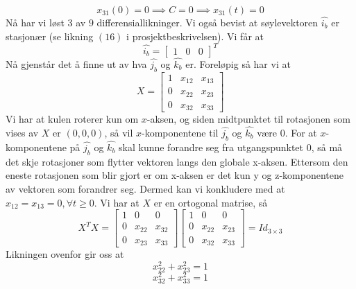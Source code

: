 \begin{equation}
    x_{31}(0)=0\implies C=0\implies x_{31}(t)=0
\end{equation}
Nå har vi løst $3$ av $9$ differensiallikninger. Vi også bevist at søylevektoren $\hat{i_b}$ er stasjonær (se likning $(16)$ i prosjektbeskrivelsen). Vi får at
\begin{equation}
\label{eqn:rolig}
\hat{i_b}=\begin{bmatrix}1&0&0\end{bmatrix}^T
\end{equation}
Nå gjenstår det å finne ut av hva $\hat{j_b}$ og $\hat{k_b}$ er. Foreløpig så har vi at
\begin{equation}
    X=\begin{bmatrix}1&x_{12}&x_{13}\\0&x_{22}&x_{23}\\0&x_{32}&x_{33}\end{bmatrix}
\end{equation}
Vi har at kulen roterer kun om $x$-aksen, og siden midtpunktet til rotasjonen som vises av $X$ er $(0,0,0)$, så vil $x$-komponentene til $\hat{j_b}$ og $\hat{k_b}$ være 0. For at $x$-komponentene på $\hat{j_b}$ og $\hat{k_b}$ skal kunne forandre seg fra utgangspunktet 0, så må det skje rotasjoner som flytter vektoren langs den globale x-aksen. Ettersom den eneste rotasjonen som blir gjort er om x-aksen er det kun y og z-komponentene av vektoren som forandrer seg. Dermed kan vi konkludere med at $x_{12}=x_{13}=0,\forall t\geq 0.$\newline\newline
Vi har at $X$ er en ortogonal matrise, så
\begin{equation}
    X^TX=\begin{bmatrix}1&0&0\\0&x_{22}&x_{32}\\0&x_{23}&x_{33}\end{bmatrix}\begin{bmatrix}1&0&0\\0&x_{22}&x_{23}\\0&x_{32}&x_{33}\end{bmatrix}=Id_{3\times3}
\end{equation}
Likningen ovenfor gir oss at
\begin{equation}
\label{eqn:circle1}
    x_{22}^2+x_{23}^2=1
\end{equation}
\begin{equation}
\label{eqn:circle2}
    x_{32}^2+x_{33}^2=1
\end{equation}
